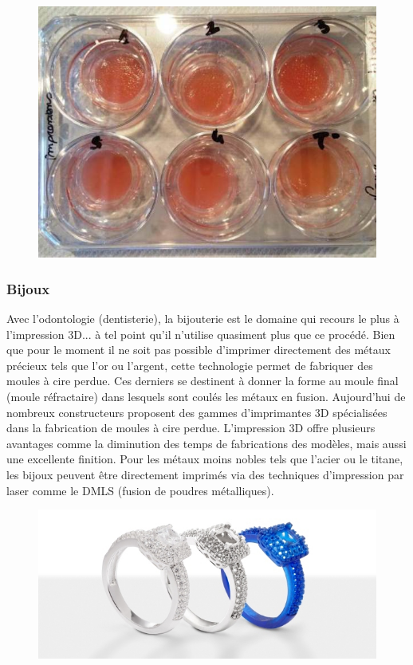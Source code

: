 \documentclass{article}
\begin{document}
\begin{figure}[h!]
\centering
\includegraphics[scale=0.4]{./images/tissus.png}
\end{figure}\hfill
\newpage

\subsubsection{Bijoux}

Avec l'odontologie (dentisterie), la bijouterie est le domaine qui recours le plus à l'impression 3D... à tel point qu'il n'utilise quasiment plus que ce procédé. Bien que pour le moment il ne soit pas possible d'imprimer directement des métaux précieux tels que l'or ou l'argent, cette technologie permet de fabriquer des moules à cire perdue. Ces derniers se destinent à donner la forme au moule final (moule réfractaire) dans lesquels sont coulés les métaux en fusion. Aujourd'hui de nombreux constructeurs proposent des gammes d'imprimantes 3D spécialisées dans la fabrication de moules à cire perdue.
L'impression 3D offre plusieurs avantages comme la diminution des temps de fabrications des modèles, mais aussi une excellente finition. Pour les métaux moins nobles tels que l'acier ou le titane, les bijoux peuvent être directement imprimés via des techniques d'impression par laser comme le DMLS (fusion de poudres métalliques).

\begin{figure}[h!]
\centering
\includegraphics[scale=0.4]{./images/bijoux.png}
\end{figure}\hfill
\newpage
\end{document}
